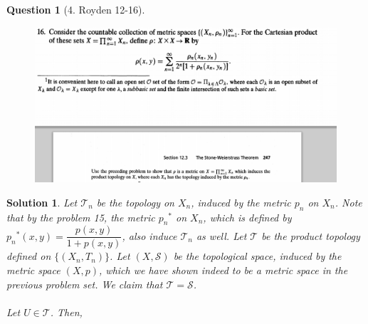 \documentclass{article} %
\theoremstyle{quest}
\newtheorem*{question}{Question}
\newtheorem*{solution}{Solution}
\begin{document}
\begin{question}[4. Royden 12-16]
\hfill \\
\begin{figure}[H]
  \centering
    \includegraphics[width=1\textwidth]{12-16}
\end{figure}
\end{question}
\begin{solution}
Let $\mathscr{T}_n$ be the topology on $X_n$, induced by 
the metric $p_n$ on $X_n$. Note that by the problem 15, the
metric ${p_n}^{*}$ on $X_n$,
which is defined by ${p_n}^{*}(x,y) = \dfrac{p(x,y)}{1+p(x,y)}$,
also induce $\mathscr{T}_n$ as well. Let $\mathscr{T}$ be the
product topology defined on $\{ (X_n, T_n )\}$. Let $(X,\mathscr{S})$
be the topological space, induced by the metric space $(X,p)$, which
we have shown indeed to be a metric space in the previous problem set.
We claim that $\mathscr{T} = \mathscr{S}$.
\\
\smallskip
\\
Let $U \in \mathscr{T}$. Then,  


 
\end{solution}

\newpage
\end{document}
